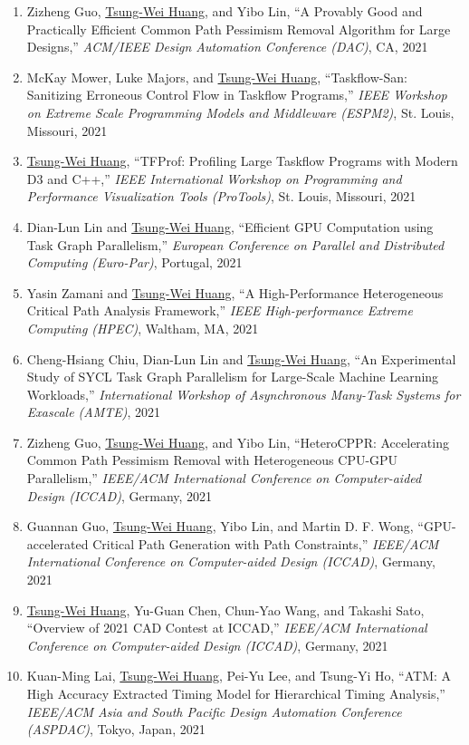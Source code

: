 \documentclass[A4,11pt]{article}
\begin{document}
\begin{enumerate}
    \item Zizheng Guo, \underline{Tsung-Wei Huang}, and Yibo Lin, ``A Provably Good and Practically Efficient Common Path Pessimism Removal Algorithm for Large Designs,'' \textit{ACM/IEEE Design Automation Conference (DAC)}, CA, 2021
    \item McKay Mower, Luke Majors, and \underline{Tsung-Wei Huang}, ``Taskflow-San: Sanitizing Erroneous Control Flow in Taskflow Programs,'' \textit{IEEE Workshop on Extreme Scale Programming Models and Middleware (ESPM2)}, St. Louis, Missouri, 2021
    \item \underline{Tsung-Wei Huang}, ``TFProf: Profiling Large Taskflow Programs with Modern D3 and C++,'' \textit{IEEE International Workshop on Programming and Performance Visualization Tools (ProTools)}, St. Louis, Missouri, 2021
    \item Dian-Lun Lin and \underline{Tsung-Wei Huang}, ``Efficient GPU Computation using Task Graph Parallelism,'' \textit{European Conference on Parallel and Distributed Computing (Euro-Par)}, Portugal, 2021
    \item Yasin Zamani and \underline{Tsung-Wei Huang}, ``A High-Performance Heterogeneous Critical Path Analysis Framework,'' \textit{IEEE High-performance Extreme Computing (HPEC)}, Waltham, MA, 2021
    \item Cheng-Hsiang Chiu, Dian-Lun Lin and \underline{Tsung-Wei Huang}, ``An Experimental Study of SYCL Task Graph Parallelism for Large-Scale Machine Learning Workloads,'' \textit{International Workshop of Asynchronous Many-Task Systems for Exascale (AMTE)}, 2021
    \item Zizheng Guo, \underline{Tsung-Wei Huang}, and Yibo Lin, ``HeteroCPPR: Accelerating Common Path Pessimism Removal with Heterogeneous CPU-GPU Parallelism,'' \textit{IEEE/ACM International Conference on Computer-aided Design (ICCAD)}, Germany, 2021
    \item Guannan Guo, \underline{Tsung-Wei Huang}, Yibo Lin, and Martin D. F. Wong, ``GPU-accelerated Critical Path Generation with Path Constraints,'' \textit{IEEE/ACM International Conference on Computer-aided Design (ICCAD)}, Germany, 2021
    \item \underline{Tsung-Wei Huang}, Yu-Guan Chen, Chun-Yao Wang, and Takashi Sato, ``Overview of 2021 CAD Contest at ICCAD,'' \textit{IEEE/ACM International Conference on Computer-aided Design (ICCAD)}, Germany, 2021
    \item Kuan-Ming Lai, \underline{Tsung-Wei Huang}, Pei-Yu Lee, and Tsung-Yi Ho, ``ATM: A High Accuracy Extracted Timing Model for Hierarchical Timing Analysis,'' \textit{IEEE/ACM Asia and South Pacific Design Automation Conference (ASPDAC)}, Tokyo, Japan, 2021

\end{enumerate}
\end{document}

